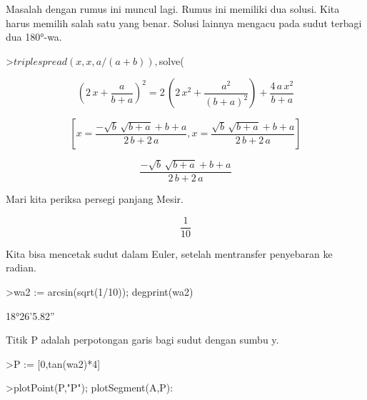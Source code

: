 \documentclass[12pt,arial,letterpaper]{book}
\begin{document}
\begin{eulernootebook}
\begin{eulercomment}
\begin{eulercomment}
\begin{eulernootebook}
\begin{eulercomment}
\begin{eulercomment}
\begin{eulercomment}
\begin{eulercomment}
\begin{eulercomment}
\begin{eulercomment}
\begin{eulernotebook}
\begin{eulercomment}
\begin{eulercomment}
\begin{eulercomment}
\begin{eulercomment}
\begin{eulercomment}
Masalah dengan rumus ini muncul lagi. Rumus ini memiliki dua solusi.
Kita harus memilih salah satu yang benar. Solusi lainnya mengacu pada
sudut terbagi dua 180°-wa.
\end{eulercomment}
\begin{eulerprompt}
>$triplespread(x,x,a/(a+b)), $solve(%
\end{eulerprompt}
\begin{eulerformula}
\[
\left(2\,x+\frac{a}{b+a}\right)^2=2\,\left(2\,x^2+\frac{a^2}{\left(
 b+a\right)^2}\right)+\frac{4\,a\,x^2}{b+a}
\]
\end{eulerformula}
\begin{eulerformula}
\[
\left[ x=\frac{-\sqrt{b}\,\sqrt{b+a}+b+a}{2\,b+2\,a} , x=\frac{
 \sqrt{b}\,\sqrt{b+a}+b+a}{2\,b+2\,a} \right] 
\]
\end{eulerformula}
\begin{eulerformula}
\[
\frac{-\sqrt{b}\,\sqrt{b+a}+b+a}{2\,b+2\,a}
\]
\end{eulerformula}
\begin{eulercomment}
Mari kita periksa persegi panjang Mesir.
\end{eulercomment}
\begin{eulerformula}
\[
\frac{1}{10}
\]
\end{eulerformula}
\begin{eulercomment}
Kita bisa mencetak sudut dalam Euler, setelah mentransfer penyebaran
ke radian.
\end{eulercomment}
\begin{eulerprompt}
>wa2 := arcsin(sqrt(1/10)); degprint(wa2)
\end{eulerprompt}
\begin{euleroutput}
  18°26'5.82''
\end{euleroutput}
\begin{eulercomment}
Titik P adalah perpotongan garis bagi sudut dengan sumbu y.
\end{eulercomment}
\begin{eulerprompt}
>P := [0,tan(wa2)*4]
\end{eulerprompt}
\begin{euleroutput}
  [0,  1.33333]
\end{euleroutput}
\begin{eulerprompt}
>plotPoint(P,"P"); plotSegment(A,P):
\end{eulerprompt}

\end{eulercomment}
\end{eulercomment}
\end{eulercomment}
\end{eulercomment}
\end{eulernotebook}
\end{eulercomment}
\end{eulercomment}
\end{eulercomment}
\end{eulercomment}
\end{eulercomment}
\end{eulercomment}
\end{eulernootebook}
\end{eulercomment}
\end{eulercomment}
\end{eulernootebook}
\end{document}
